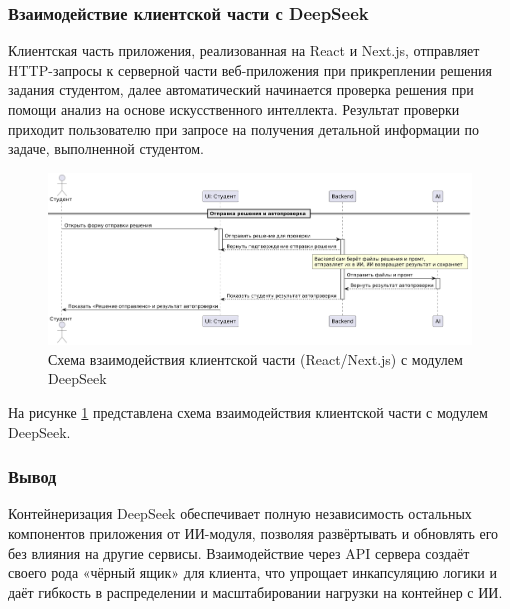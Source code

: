 \subsubsection{Взаимодействие клиентской части с DeepSeek}

Клиентская часть приложения, реализованная на React и Next.js, отправляет HTTP-запросы к серверной части веб-приложения при прикреплении решения задания студентом, далее автоматический начинается проверка решения при помощи анализ на основе искусственного интеллекта. Результат проверки приходит пользователю при запросе на получения детальной информации по задаче, выполненной студентом.

\begin{figure}[h]
    \centering
    \includegraphics[width=0.8\linewidth]{static/diagrams/TaskSendStudentDiagram.png}
    \caption{Схема взаимодействия клиентской части (React/Next.js) с модулем DeepSeek}
    \label{fig:client-deepseek}
\end{figure}

На рисунке \ref{fig:client-deepseek} представлена схема взаимодействия клиентской части с модулем DeepSeek.

\subsubsection{Вывод}

Контейнеризация DeepSeek обеспечивает полную независимость остальных компонентов приложения от ИИ-модуля, позволяя развёртывать и обновлять его без влияния на другие сервисы. Взаимодействие через API сервера создаёт своего рода «чёрный ящик» для клиента, что упрощает инкапсуляцию логики и даёт гибкость в распределении и масштабировании нагрузки на контейнер с ИИ.


